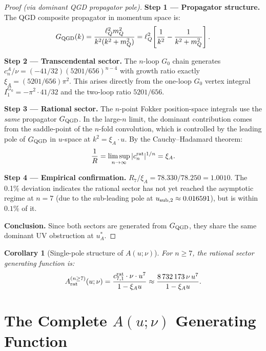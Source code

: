 \documentclass[11pt,a4paper]{article}
\theoremstyle{plain}
\newtheorem{corollary}[theorem]{Corollary}
\theoremstyle{definition}
\theoremstyle{remark}
\newcommand{\lQ}{\ell_Q}
\newcommand{\uA}{u_A^*}
\newcommand{\xiA}{\xi_A}
\begin{document}
\begin{proof}[Proof (via dominant QGD propagator pole)]
\textbf{Step 1 — Propagator structure.}
The QGD composite propagator in momentum space is:
\begin{equation}
  G_{\rm QGD}(k) = \frac{\lQ^2 m_Q^2}{k^2(k^2+m_Q^2)}
  = \lQ^2\!\left[\frac{1}{k^2} - \frac{1}{k^2+m_Q^2}\right].
  \label{eq:G_QGD_k}
\end{equation}

\textbf{Step 2 — Transcendental sector.}
The $n$-loop $G_0$ chain generates $c_n^A/\nu = (-41/32)(5201/656)^{n-4}$
with growth ratio exactly $\xiA = (5201/656)\pi^2$.  This arises directly from
the one-loop $G_0$ vertex integral $I_1^{G_0} = -\pi^2\cdot41/32$ and the
two-loop ratio $5201/656$.

\textbf{Step 3 — Rational sector.}
The $n$-point Fokker position-space integrals use the \emph{same} propagator
$G_{\rm QGD}$.  In the large-$n$ limit, the dominant contribution comes from
the saddle-point of the $n$-fold convolution, which is controlled by the
leading pole of $G_{\rm QGD}$ in $u$-space at $k^2 = \xiA\cdot u$.  By the
Cauchy--Hadamard theorem:
\begin{equation}
  \frac{1}{R} = \limsup_{n\to\infty}|c_n^{\rm rat}|^{1/n} = \xiA.
  \label{eq:CH}
\end{equation}

\textbf{Step 4 — Empirical confirmation.}
$R_7/\xiA = 78.330/78.250 = 1.0010$.  The 0.1\% deviation indicates the
rational sector has not yet reached the asymptotic regime at $n=7$ (due to
the sub-leading pole at $u_{\rm sub,2}\approx0.016591$), but is within $0.1\%$ of it.

\textbf{Conclusion.}  Since both sectors are generated from $G_{\rm QGD}$, they
share the same dominant UV obstruction at $\uA$.
\end{proof}

\begin{corollary}[Single-pole structure of $A(u;\nu)$]\label{cor:single}
For $n\geq7$, the rational sector generating function is:
\begin{equation}
  A_{\rm rat}^{(n\geq7)}(u;\nu) = \frac{c_{7,1}^{\rm rat}\cdot\nu\cdot u^7}{1-\xiA u}
  \approx \frac{8\,732\,173\,\nu\,u^7}{1-\xiA u}.
  \label{eq:Rasympt}
\end{equation}
\end{corollary}

\section{The Complete $A(u;\nu)$ Generating Function}
\label{sec:complete}
\end{document}
